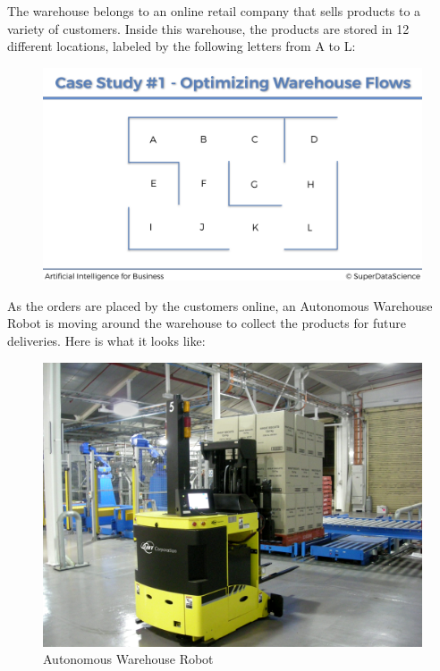\documentclass[]{book}
\begin{document}
The warehouse belongs to an online retail company that sells products to a variety of customers. Inside this warehouse, the products are stored in 12 different locations, labeled by the following letters from A to L:

\begin{figure}[!htbp]
        \begin{center}
            \includegraphics[scale=0.15]{Warehouse_2.png}
        \end{center}
\end{figure}

As the orders are placed by the customers online, an Autonomous Warehouse Robot is moving around the warehouse to collect the products for future deliveries. Here is what it looks like:

\begin{figure}[!htbp]
        \begin{center}
            \includegraphics[scale=0.75]{Autonomous_Warehouse_Robot.jpg}
            \caption{Autonomous Warehouse Robot}
        \end{center}
\end{figure}
\end{document}
